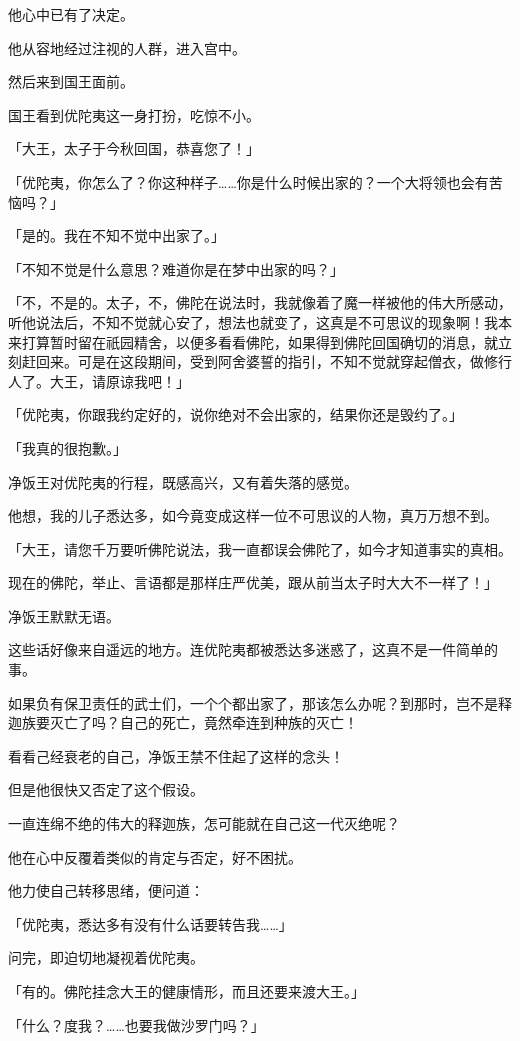 \documentclass[twoside,openany]{book}
\begin{document}
他心中已有了决定。

他从容地经过注视的人群，进入宫中。

然后来到国王面前。

国王看到优陀夷这一身打扮，吃惊不小。

「大王，太子于今秋回国，恭喜您了！」

「优陀夷，你怎么了？你这种样子……你是什么时候出家的？一个大将领也会有苦恼吗？」

「是的。我在不知不觉中出家了。」

「不知不觉是什么意思？难道你是在梦中出家的吗？」

「不，不是的。太子，不，佛陀在说法时，我就像着了魔一样被他的伟大所感动，听他说法后，不知不觉就心安了，想法也就变了，这真是不可思议的现象啊！我本来打算暂时留在祇园精舍，以便多看看佛陀，如果得到佛陀回国确切的消息，就立刻赶回来。可是在这段期间，受到阿舍婆誓的指引，不知不觉就穿起僧衣，做修行人了。大王，请原谅我吧！」

「优陀夷，你跟我约定好的，说你绝对不会出家的，结果你还是毁约了。」

「我真的很抱歉。」

净饭王对优陀夷的行程，既感高兴，又有着失落的感觉。

他想，我的儿子悉达多，如今竟变成这样一位不可思议的人物，真万万想不到。

「大王，请您千万要听佛陀说法，我一直都误会佛陀了，如今才知道事实的真相。

现在的佛陀，举止、言语都是那样庄严优美，跟从前当太子时大大不一样了！」

净饭王默默无语。

这些话好像来自遥远的地方。连优陀夷都被悉达多迷惑了，这真不是一件简单的事。

如果负有保卫责任的武士们，一个个都出家了，那该怎么办呢？到那时，岂不是释迦族要灭亡了吗？自己的死亡，竟然牵连到种族的灭亡！

看看己经衰老的自己，净饭王禁不住起了这样的念头！

但是他很快又否定了这个假设。

一直连绵不绝的伟大的释迦族，怎可能就在自己这一代灭绝呢？

他在心中反覆着类似的肯定与否定，好不困扰。

他力使自己转移思绪，便问道：

「优陀夷，悉达多有没有什么话要转告我……」

问完，即迫切地凝视着优陀夷。

「有的。佛陀挂念大王的健康情形，而且还要来渡大王。」

「什么？度我？……也要我做沙罗门吗？」
\end{document}
